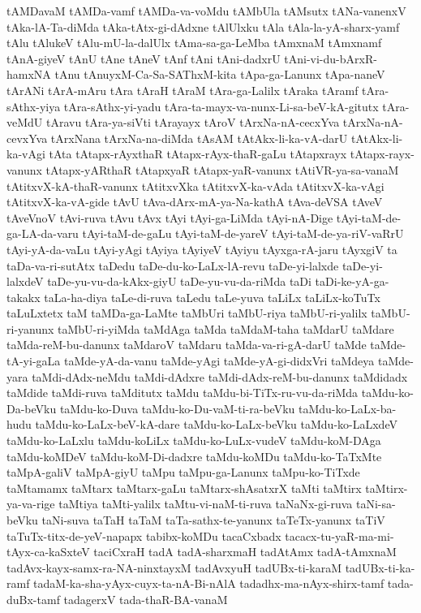 {tAMDavaM
tAMDa-vamf
tAMDa-va-voMdu
tAMbUla
tAMsutx
tANa-vanenxV
tAka-lA-Ta-diMda
tAka-tAtx-gi-dAdxne
tAlUlxku
tAla
tAla-la-yA-sharx-yamf
tAlu
tAlukeV
tAlu-mU-la-dalUlx
tAma-sa-ga-LeMba
tAmxnaM
tAmxnamf
tAnA-giyeV
tAnU
tAne
tAneV
tAnf
tAni
tAni-dadxrU
tAni-vi-du-bArxR-hamxNA
tAnu
tAnuyxM-Ca-Sa-SAThxM-kita
tApa-ga-Lanunx
tApa-naneV
tArANi
tArA-mAru
tAra
tAraH
tAraM
tAra-ga-Lalilx
tAraka
tAramf
tAra-sAthx-yiya
tAra-sAthx-yi-yadu
tAra-ta-mayx-va-nunx-Li-sa-beV-kA-gitutx
tAra-veMdU
tAravu
tAra-ya-siVti
tArayayx
tAroV
tArxNa-nA-cecxYva
tArxNa-nA-cevxYva
tArxNana
tArxNa-na-diMda
tAsAM
tAtAkx-li-ka-vA-darU
tAtAkx-li-ka-vAgi
tAta
tAtapx-rAyxthaR
tAtapx-rAyx-thaR-gaLu
tAtapxrayx
tAtapx-rayx-vanunx
tAtapx-yARthaR
tAtapxyaR
tAtapx-yaR-vanunx
tAtiVR-ya-sa-vanaM
tAtitxvX-kA-thaR-vanunx
tAtitxvXka
tAtitxvX-ka-vAda
tAtitxvX-ka-vAgi
tAtitxvX-ka-vA-gide
tAvU
tAva-dArx-mA-ya-Na-kathA
tAva-deVSA
tAveV
tAveVnoV
tAvi-ruva
tAvu
tAvx
tAyi
tAyi-ga-LiMda
tAyi-nA-Dige
tAyi-taM-de-ga-LA-da-varu
tAyi-taM-de-gaLu
tAyi-taM-de-yareV
tAyi-taM-de-ya-riV-vaRrU
tAyi-yA-da-vaLu
tAyi-yAgi
tAyiya
tAyiyeV
tAyiyu
tAyxga-rA-jaru
tAyxgiV
ta
taDa-va-ri-sutAtx
taDedu
taDe-du-ko-LaLx-lA-revu
taDe-yi-lalxde
taDe-yi-lalxdeV
taDe-yu-vu-da-kAkx-giyU
taDe-yu-vu-da-riMda
taDi
taDi-ke-yA-ga-takakx
taLa-ha-diya
taLe-di-ruva
taLedu
taLe-yuva
taLiLx
taLiLx-koTuTx
taLuLxtetx
taM
taMDa-ga-LaMte
taMbUri
taMbU-riya
taMbU-ri-yalilx
taMbU-ri-yanunx
taMbU-ri-yiMda
taMdAga
taMda
taMdaM-taha
taMdarU
taMdare
taMda-reM-bu-danunx
taMdaroV
taMdaru
taMda-va-ri-gA-darU
taMde
taMde-tA-yi-gaLa
taMde-yA-da-vanu
taMde-yAgi
taMde-yA-gi-didxVri
taMdeya
taMde-yara
taMdi-dAdx-neMdu
taMdi-dAdxre
taMdi-dAdx-reM-bu-danunx
taMdidadx
taMdide
taMdi-ruva
taMditutx
taMdu
taMdu-bi-TiTx-ru-vu-da-riMda
taMdu-ko-Da-beVku
taMdu-ko-Duva
taMdu-ko-Du-vaM-ti-ra-beVku
taMdu-ko-LaLx-ba-hudu
taMdu-ko-LaLx-beV-kA-dare
taMdu-ko-LaLx-beVku
taMdu-ko-LaLxdeV
taMdu-ko-LaLxlu
taMdu-koLiLx
taMdu-ko-LuLx-vudeV
taMdu-koM-DAga
taMdu-koMDeV
taMdu-koM-Di-dadxre
taMdu-koMDu
taMdu-ko-TaTxMte
taMpA-galiV
taMpA-giyU
taMpu
taMpu-ga-Lanunx
taMpu-ko-TiTxde
taMtamamx
taMtarx
taMtarx-gaLu
taMtarx-shAsatxrX
taMti
taMtirx
taMtirx-ya-va-rige
taMtiya
taMti-yalilx
taMtu-vi-naM-ti-ruva
taNaNx-gi-ruva
taNi-sa-beVku
taNi-suva
taTaH
taTaM
taTa-sathx-te-yanunx
taTeTx-yanunx
taTiV
taTuTx-titx-de-yeV-napapx
tabibx-koMDu
tacaCxbadx
tacacx-tu-yaR-ma-mi-tAyx-ca-kaSxteV
taciCxraH
tadA
tadA-sharxmaH
tadAtAmx
tadA-tAmxnaM
tadAvx-kayx-samx-ra-NA-ninxtayxM
tadAvxyuH
tadUBx-ti-karaM
tadUBx-ti-ka-ramf
tadaM-ka-sha-yAyx-cuyx-ta-nA-Bi-nAlA
tadadhx-ma-nAyx-shirx-tamf
tada-duBx-tamf
tadagerxV
tada-thaR-BA-vanaM
}
